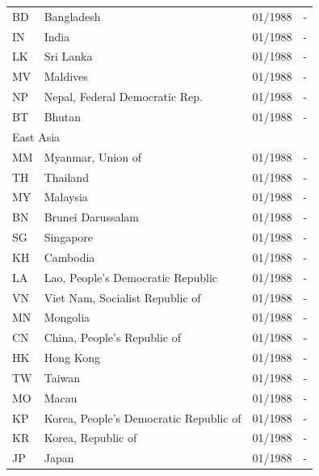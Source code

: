 \begin{footnotesize}
\begin{longtable}{p{0.5cm}p{9cm}p{2cm}p{2cm}}
BD	&	Bangladesh	&	01/1988	&	-	\\

IN	&	India	&	01/1988	&	-	\\

LK	&	Sri Lanka	&	01/1988	&	-	\\

MV	&	Maldives	&	01/1988	&	-	\\

NP	&	Nepal, Federal Democratic Rep.	&	01/1988	&	-	\\

BT	&	Bhutan	&	01/1988	&	-	\\

\midrule
\multicolumn{3}{l}{East Asia}	&	\\
MM	&	Myanmar, Union of	&	01/1988	&	-	\\

TH	&	Thailand	&	01/1988	&	-	\\

MY	&	Malaysia	&	01/1988	&	-	\\

BN	&	Brunei Darussalam	&	01/1988	&	-	\\

SG	&	Singapore	&	01/1988	&	-	\\

KH	&	Cambodia	&	01/1988	&	-	\\

LA	&	Lao, People's Democratic Republic	&	01/1988	&	-	\\

VN	&	Viet Nam, Socialist Republic of	&	01/1988	&	-	\\

MN	&	Mongolia	&	01/1988	&	-	\\

CN	&	China, People's Republic of	&	01/1988	&	-	\\

HK	&	Hong Kong	&	01/1988	&	-	\\

TW	&	Taiwan	&	01/1988	&	-	\\

MO	&	Macau	&	01/1988	&	-	\\

KP	&	Korea, People's Democratic Republic of	&	01/1988	&	-	\\

KR	&	Korea, Republic of	&	01/1988	&	-	\\

JP	&	Japan	&	01/1988	&	-	\\


\end{longtable}
\end{footnotesize}
